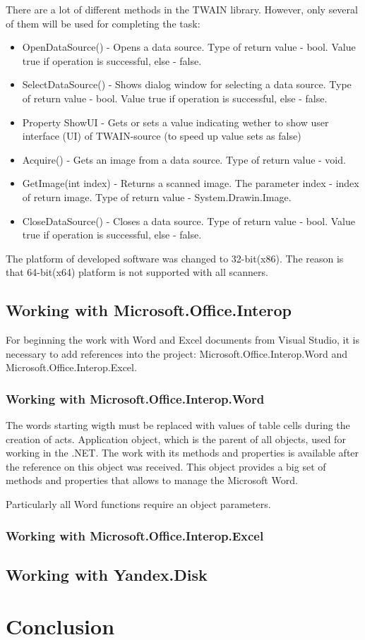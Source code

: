 \documentclass[12pt,journal,compsoc]{D:/Магистратура/English/bare_conf/IEEEtran}
\begin{document}
There are a lot of different methods in the TWAIN library. However, only several of them will be used for completing the task:
\begin{itemize}
\item OpenDataSource() - Opens a data source. Type of return value - bool. Value true if operation is successful, else - false. 
\item SelectDataSource() - Shows dialog window for selecting a data source. Type of return value - bool. Value true if operation is successful, else - false.
\item Property ShowUI - Gets or sets a value indicating wether to show user interface (UI) of TWAIN-source (to speed up value sets as false)
\item Acquire() - Gets an image from a data source. Type of return value - void. 
\item GetImage(int index) - Returns a scanned image. The parameter index - index of return image. Type of return value - System.Drawin.Image. 
\item CloseDataSource() - Closes a data source. Type of return value - bool. Value true if operation is successful, else - false.
\end{itemize}

The platform of developed software was changed to 32-bit(x86). The reason is that 64-bit(x64) platform is not supported with all scanners.

\subsection{Working with Microsoft.Office.Interop}
For beginning the work with Word and Excel documents from Visual Studio, it is necessary to add references into the project: Microsoft.Office.Interop.Word and Microsoft.Office.Interop.Excel. 

\subsubsection{Working with Microsoft.Office.Interop.Word}
The words starting wigth \@ must be replaced with values of table cells during the creation of acts. Application object, which is the parent of all objects, used for working  in the .NET. The work with its methods and properties is available after the reference on this object was received. This object provides a big set of methods and properties that allows to manage the Microsoft Word. 

Particularly all Word functions require an object parameters.


\subsubsection{Working with Microsoft.Office.Interop.Excel}

\subsection{Working with Yandex.Disk}

\section{Conclusion}
\end{document}
